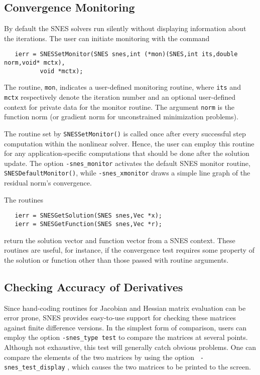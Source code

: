 \subsection{Convergence Monitoring}
\label{sec:snesmonitor}

By default the SNES solvers run silently without displaying information
about the iterations. The user can initiate monitoring with the
command  
\begin{verbatim}
   ierr = SNESSetMonitor(SNES snes,int (*mon)(SNES,int its,double norm,void* mctx),
          void *mctx);
\end{verbatim}
The routine, {\tt mon}, indicates a user-defined monitoring routine,
where {\tt its} and {\tt mctx} respectively denote the iteration
number and an optional user-defined context for private data for the
monitor routine.  The argument {\tt norm} is the function norm (or
gradient norm for unconstrained minimization problems).

The routine set by {\tt SNESSetMonitor()} is called once after every
successful step computation within the nonlinear solver.  Hence, the
user can employ this routine for any application-specific computations
that should be done after the solution update. The option
{\tt -snes\_monitor}  activates the default
SNES monitor routine, {\tt SNESDefaultMonitor()}, 
while {\tt -snes\_xmonitor}  draws
a simple line graph of the residual norm's convergence.

The routines  
\begin{verbatim}
   ierr = SNESGetSolution(SNES snes,Vec *x);
   ierr = SNESGetFunction(SNES snes,Vec *r);
\end{verbatim}
return the solution vector and function vector from a SNES context. 
These routines are useful, for instance, if the convergence test requires 
some property of the solution or function other than those passed with
routine arguments.

\subsection{Checking Accuracy of Derivatives}
\label{sec:snesderivs}

Since hand-coding routines for Jacobian and Hessian matrix evaluation
can be error prone, SNES provides easy-to-use support for checking
these matrices against finite difference versions.  In the simplest
form of comparison, users can employ the option {\tt -snes\_type test}
to compare the matrices at several points.  Although not exhaustive,
this test will generally catch obvious problems.  One can compare the
elements of the two matrices by using the option {\tt
-snes\_test\_display} , which causes the two 
matrices to be printed to the screen.  

